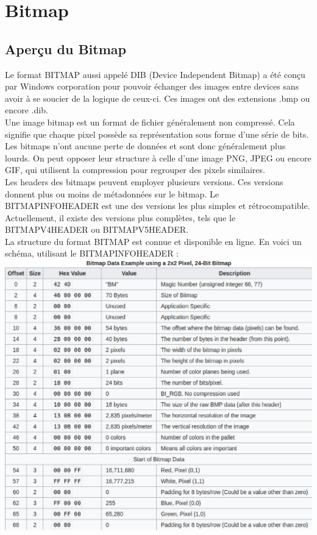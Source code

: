 \section{Bitmap}

\subsection{Aperçu du Bitmap}
Le format BITMAP aussi appelé DIB (Device Independent Bitmap) a été conçu par Windows corporation pour pouvoir échanger des images entre devices sans avoir à se soucier de la logique de ceux-ci.
Ces images ont des extensions .bmp ou encore .dib.\\
Une image bitmap est un format de fichier généralement non compressé. Cela signifie que chaque pixel possède sa représentation sous forme d'une série de bits.
Les bitmaps n'ont aucune perte de données et sont donc généralement plus lourds.
On peut opposer leur structure à celle d'une image PNG, JPEG ou encore GIF, qui utilisent la compression pour regrouper des pixels similaires.\\
Les headers des bitmaps peuvent employer plusieurs versions. Ces versions donnent plus ou moins de métadonnées sur le bitmap. 
Le BITMAPINFOHEADER est une des versions les plus simples et rétrocompatible. 
Actuellement, il existe des versions plus complètes, tels que le BITMAPV4HEADER ou BITMAPV5HEADER.\\
La structure du format BITMAP est connue et disponible en ligne. En voici un schéma, utilisant le BITMAPINFOHEADER :\\

\includegraphics[width=14cm]{bitmap_structure.eps}


